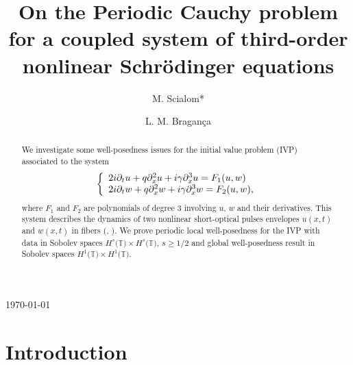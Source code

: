 \documentclass[reqno]{amsart}
\numberwithin{equation}{section}
\begin{document}
\today
\title[Coupled third-order nonlinear Schr\"{o}dinger System]{On the Periodic Cauchy problem
for a coupled system of third-order nonlinear Schr\"{o}dinger
equations}
\author{M. Scialom*}
\address{IMECC-UNICAMP\\
13083-970, Campinas, S\~ao Paulo, Brazil}

\author{L. M. Bragan\c {c}a}
\address{DMA-UFV\\  36570-000, Vi\c{c}osa, Minas Gerais, Brazil.}

\begin{abstract}
We investigate some well-posedness issues for the initial value
problem (IVP) associated to the system
\begin{equation*}
\left\{
\begin{array}
[c]{l}2i\partial_{t}u+q\partial_{x}^{2}u+i\gamma\partial_{x}^{3}u=F_{1}(u,w)\\
2i\partial_{t}w+q\partial_{x}^{2}w+i\gamma\partial_{x}^{3}w=F_{2}(u,w)\text{,}\end{array}
\right.
\end{equation*}
where $F_{1}$ and $F_{2}$ are polynomials of degree 3 involving
$u$, $w$ and their derivatives. This system describes the dynamics
of two nonlinear short-optical pulses envelopes $u(x,t)$ and
$w(x,t)$ in fibers (\cite{31}, \cite{14}). We prove periodic local
well-posedness for the IVP with data in Sobolev spaces
$H^{s}(\mathbb{T)\times} H^{s}(\mathbb{T)}$, $ s\geq 1/2$ and
global well-posedness result in Sobolev spaces
$H^{1}(\mathbb{T)\times }H^{1}(\mathbb{T)}$.
\end{abstract}

\maketitle

{\section{{Introduction}}\setcounter{equation}{0}}
\end{document}
